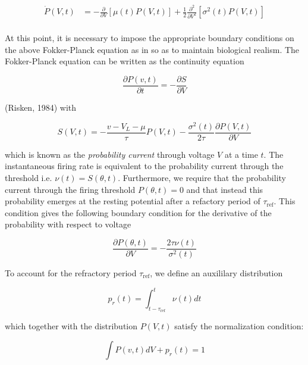 \documentclass{ucetd}
\begin{document}
\begin{align*}
\dot{P}(V,t) &= -\frac{\partial}{\partial V}[\mu(t)P(V,t)] + \frac{1}{2}\frac{\partial^{2}}{\partial V^{2}}[\sigma^{2}(t)P(V,t)]\\
\end{align*} 

At this point, it is necessary to impose the appropriate boundary conditions on the above Fokker-Planck equation as in so as to maintain biological realism. The Fokker-Planck equation can be written as the continuity equation 

\begin{equation*}
\frac{\partial P(v,t)}{\partial t} = -\frac{\partial S}{\partial V}
\end{equation*}

(Risken, 1984) with 

\begin{equation*}
S(V,t) = -\frac{v-V_{L}-\mu}{\tau}P(V,t) - \frac{\sigma^{2}(t)}{2\tau}\frac{\partial P(V,t)}{\partial V}
\end{equation*}

which is known as the \emph{probability current} through voltage $V$ at a time $t$. The instantaneous firing rate is equivalent to the probability current through the threshold i.e. $\nu(t) = S(\theta,t)$. Furthermore, we require that the probability current through the firing threshold $P(\theta, t)=0$ and that instead this probability emerges at the resting potential after a refactory period of $\tau_{\mathrm{ref}}$. This condition gives the following boundary condition for the derivative of the probability with respect to voltage

\begin{equation*}
\frac{\partial P(\theta,t)}{\partial V} = -\frac{2\tau\nu(t)}{\sigma^{2}(t)}
\end{equation*}

To account for the refractory period $\tau_{\mathrm{ref}}$, we define an auxililary distribution

\begin{equation*}
p_{r}(t) = \int_{t-\tau_{\mathrm{ref}}}^{t} \nu(t)dt
\end{equation*}

which together with the distribution $P(V,t)$ satisfy the normalization condition:

\begin{equation*}
\int P(v,t)dV + p_{r}(t) = 1
\end{equation*}
\end{document}
